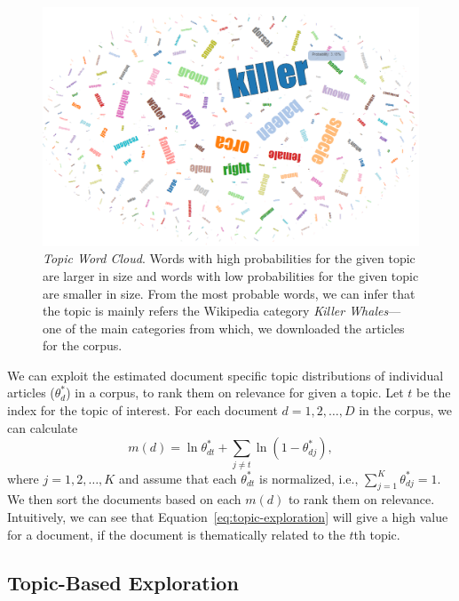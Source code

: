 \begin{figure}[htb]\centering 
\includegraphics[width=.9\textwidth]{images/topic_visualization.png}
\caption{\textsl{Topic Word Cloud}. Words with high probabilities for the 
given topic are larger in size and words with low probabilities for 
the given topic are smaller in size. From the most probable words, 
we can infer that the topic is mainly refers the Wikipedia category 
\textit{Killer Whales}---one of the main categories from which, we 
downloaded the articles for the corpus.}
\label{fig:topic-word-cloud}
\end{figure}

We can exploit the estimated document specific topic distributions 
 of individual articles ($\theta_d^{*}$) in a corpus, to rank them on 
relevance for given a topic. Let $t$ be the index for the topic of 
interest. For each document $d = 1, 2, \ldots, D$ in the corpus, we 
can calculate~\cite{George2012}
\begin{equation}
m(d) = \ln \theta^*_{dt} + \sum_{j \neq t}{\ln (1 - \theta^*_{dj})},
\label{eq:topic-exploration}
\end{equation} 
where $j = 1, 2, \ldots, K$ and assume that each $\theta^*_{dt}$ is 
normalized, i.e., $\sum_{j=1}^{K}{\theta^*_{dj}} = 1$. We then sort 
the documents based on each $m(d)$ to rank them on relevance. 
Intuitively, we can see that Equation~\ref{eq:topic-exploration} 
will give a high value for a document, if the document is 
thematically related to the $t$th topic. 

\subsection{Topic-Based Exploration}

